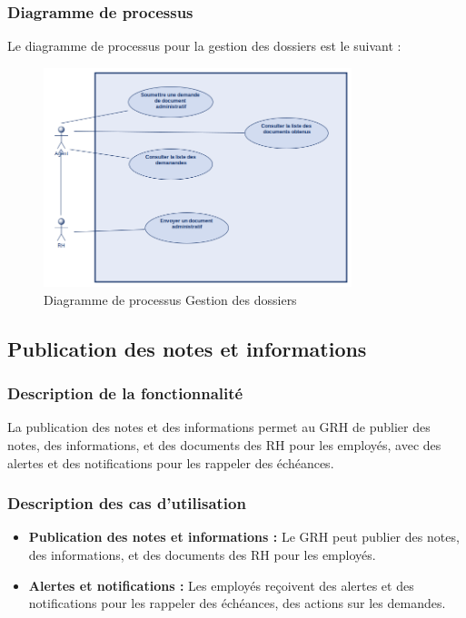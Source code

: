\subsubsection{Diagramme de processus}
Le diagramme de processus pour la gestion des dossiers est le suivant :
\begin{figure}[H]
    \centering
    \includegraphics[width=0.8\textwidth]{images/diagrammes/flowcharts/dossiers.png}
    \caption{Diagramme de processus Gestion des dossiers}
    \label{fig:flow_gestion_dossiers}
\end{figure}
\subsection{Publication des notes et informations}
\subsubsection{Description de la fonctionnalité}
La publication des notes et des informations permet au GRH de publier des notes, des informations, et des documents des \ac{RH} pour les employés, avec des alertes et des notifications pour les rappeler des échéances.
\subsubsection{Description des cas d'utilisation}   
\begin{itemize}
    \item \textbf{Publication des notes et informations :} Le GRH peut publier des notes, des informations, et des documents des \ac{RH} pour les employés.
    \item \textbf{Alertes et notifications :} Les employés reçoivent des alertes et des notifications pour les rappeler des échéances, des actions sur les demandes.
\end{itemize}
